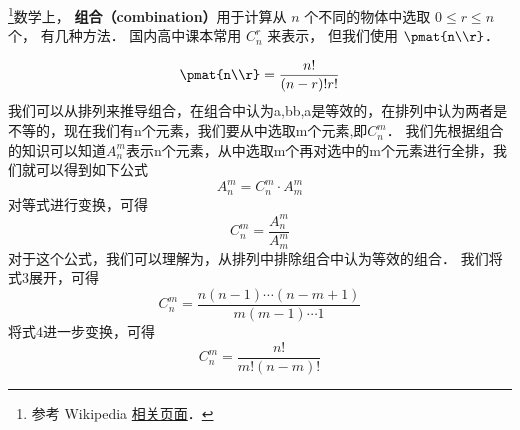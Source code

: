 
\begin{issues}
\issueDraft
\end{issues}


\footnote{参考 Wikipedia \href{https://en.wikipedia.org/wiki/Combination}{相关页面}．}数学上， \textbf{组合（combination）}用于计算从 $n$ 个不同的物体中选取 $0 \leqslant r \leqslant n$ 个， 有几种方法． 国内高中课本常用 $C_n^r$ 来表示， 但我们使用 $\pmat{n\\r}$．

\begin{equation}
\pmat{n\\r} = \frac{n!}{(n-r)!r!}
\end{equation}
我们可以从排列来推导组合，在组合中认为{a,b}{b,a}是等效的，在排列中认为两者是不等的，现在我们有n个元素，我们要从中选取m个元素,即$C_n^m$．
我们先根据组合的知识可以知道$A_n^m$表示n个元素，从中选取m个再对选中的m个元素进行全排，我们就可以得到如下公式\begin{equation}
A_n^m = C_n^m \cdot A_m^m
\end{equation}
对等式进行变换，可得\begin{equation}
C_n^m = \frac{A_n^m}{A_m^m}
\end{equation}
对于这个公式，我们可以理解为，从排列中排除组合中认为等效的组合．
我们将式3展开，可得
\begin{equation}
C_n^m = \frac{n(n - 1) \cdots (n - m + 1)}{m(m-1)\cdots 1}
\end{equation}
将式4进一步变换，可得
\begin{equation}
C_n^m = \frac{n!}{m!(n-m)!}
\end{equation}